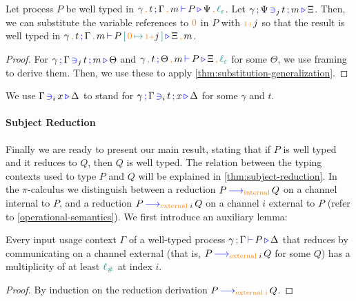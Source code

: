 \documentclass[]{llncs}
\newcommand{\picalc}{$\pi$-calculus}
\newcommand{\type}[1]{\textcolor{blue}{\operatorname{#1}}}
\newcommand{\constr}[1]{\textcolor{orange}{\operatorname{#1}}}
\newcommand{\func}[1]{\textcolor{teal}{\operatorname{#1}}}
\newcommand{\suc}{\constr{\scriptstyle 1+}}
\newcommand{\comma}{\, \constr{,} \,}
\newcommand{\subst}[3]{#1 \, \func{[} \, #3 \, \func{\mapsto} \,#2 \, \func{]}}
\newcommand{\lz}{\func{\ell_{\varepsilon}}}
\newcommand{\lio}{\func{\ell_{\#}}}
\newcommand{\reduce}[1]{\, \type{\longrightarrow}_{#1} \,}
\newcommand{\types}[4]{#1 \, \type{;} \, #2 \, \type{\vdash} \, #3 \, \type{\triangleright} \, #4}
\newcommand{\contains}[6]{#1 \, \type{;} \, #2 \, \type{\ni}_{#3} \, #4 \, \type{;} \, #5 \, \type{\triangleright} \, #6}
\newcommand{\containsusage}[4]{#1 \, \type{\ni}_{#2} \, #3 \, \type{\triangleright} \, #4}
\begin{document}
\begin{nitheorem}[Substitution]
  \label{thm:substitution}
  Let process $P$ be well typed in $\types{\gamma \comma t}{\Gamma \comma m}{P}{\Psi \comma \lz}$.
  Let $\contains{\gamma}{\Psi}{j}{t}{m}{\Xi}$.
  Then, we can substitute the variable references to $\constr{0}$ in $P$ with $\suc j$ so that the result is well typed in $\types{\gamma \comma t}{\Gamma \comma m}{\subst{P}{\suc j}{\constr{0}}}{\Xi \comma m}$.
\end{nitheorem}
\begin{proof}[Proof]
  For $\contains{\gamma}{\Gamma}{j}{t}{m}{\Theta}$ and $\types{\gamma \comma t}{\Theta \comma m}{P}{\Xi \comma \lz}$ for some $\Theta$, we use framing to derive them.
  Then, we use these to apply \autoref{thm:substitution-generalization}.
\end{proof}


  We use $\containsusage{\Gamma}{i}{x}{\Delta}$ to stand for $\contains{\gamma}{\Gamma}{i}{t}{x}{\Delta}$ for some $\gamma$ and $t$.

\paragraph*{Subject Reduction}
Finally we are ready to present our main result, stating  that if $P$ is well typed and it reduces to $Q$, then $Q$ is well typed.
The relation between the typing contexts used to type $P$ and $Q$ will be explained in \autoref{thm:subject-reduction}.
In the \picalc{} we distinguish between a reduction $P \reduce{\constr{internal}} Q$ on a channel internal to $P$, and a reduction $P \reduce{\constr{external} \; i} Q$ on a channel $i$ external to $P$ (refer to \autoref{operational-semantics}).
We first introduce an auxiliary lemma:

\begin{nilemma}
  \label{lm:comm-capable}
  Every input usage context $\Gamma$ of a well-typed process $\types{\gamma}{\Gamma}{P}{\Delta}$ that reduces by communicating on a channel external (that is, $P \reduce{\constr{external} \; i} Q$ for some $Q$) has a multiplicity of at least $\lio$ at index $i$.
\end{nilemma}

\begin{proof}
  By induction on the reduction derivation $P \reduce{\constr{external \; i}}Q$.
\end{proof}
\end{document}
